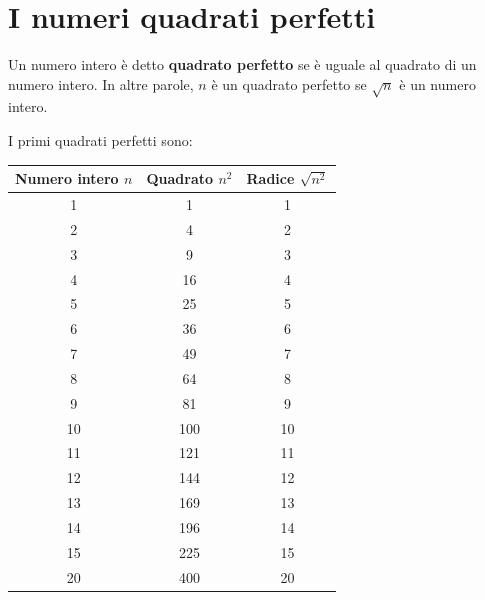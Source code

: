 \section{I numeri quadrati perfetti}

\begin{definizione}
    Un numero intero è detto \textbf{quadrato perfetto} se è uguale al quadrato
    di un numero intero. In altre parole, \(n\) è un quadrato perfetto se
    \(\sqrt{n}\) è un numero intero.
\end{definizione}

I primi quadrati perfetti sono:

\begin{center}
    \begin{tabular}{ccc}
        \toprule
        Numero intero \(n\) & Quadrato \(n^2\) & Radice \(\sqrt{n^2}\) \\
        \midrule
        1                   & 1                & 1                     \\
        2                   & 4                & 2                     \\
        3                   & 9                & 3                     \\
        4                   & 16               & 4                     \\
        5                   & 25               & 5                     \\
        6                   & 36               & 6                     \\
        7                   & 49               & 7                     \\
        8                   & 64               & 8                     \\
        9                   & 81               & 9                     \\
        10                  & 100              & 10                    \\
        11                  & 121              & 11                    \\
        12                  & 144              & 12                    \\
        13                  & 169              & 13                    \\
        14                  & 196              & 14                    \\
        15                  & 225              & 15                    \\
        20                  & 400              & 20                    \\
        \bottomrule
    \end{tabular}
\end{center}


